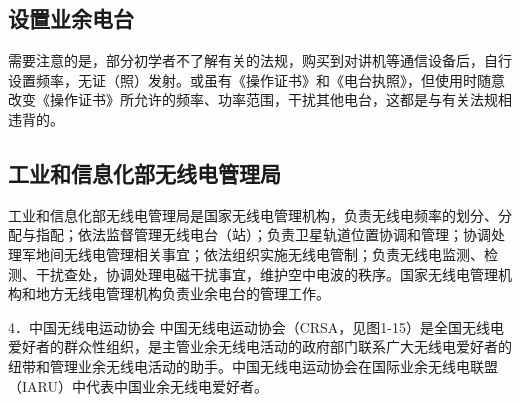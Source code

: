 \documentclass[12pt,UTF8]{ctexbook}
\begin{document}
\subsection{设置业余电台}

需要注意的是，部分初学者不了解有关的法规，购买到对讲机等通信设备后，自行设置频率，无证（照）发射。或虽有《操作证书》和《电台执照》，但使用时随意改变《操作证书》所允许的频率、功率范围，干扰其他电台，这都是与有关法规相违背的。

\subsection{工业和信息化部无线电管理局}

工业和信息化部无线电管理局是国家无线电管理机构，负责无线电频率的划分、分配与指配；依法监督管理无线电台（站）；负责卫星轨道位置协调和管理；协调处理军地间无线电管理相关事宜；依法组织实施无线电管制；负责无线电监测、检测、干扰查处，协调处理电磁干扰事宜，维护空中电波的秩序。国家无线电管理机构和地方无线电管理机构负责业余电台的管理工作。

4．中国无线电运动协会
中国无线电运动协会（CRSA，见图1-15）是全国无线电爱好者的群众性组织，是主管业余无线电活动的政府部门联系广大无线电爱好者的纽带和管理业余无线电活动的助手。中国无线电运动协会在国际业余无线电联盟（IARU）中代表中国业余无线电爱好者。
\end{document}
